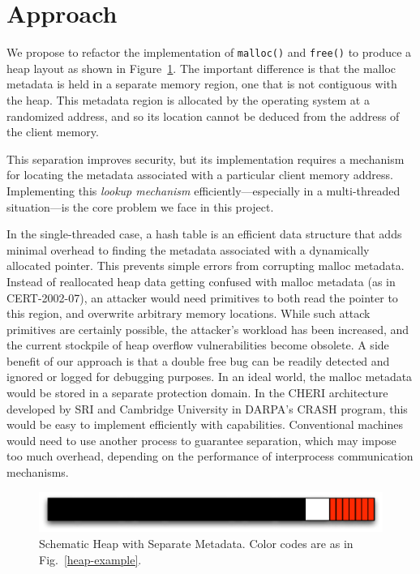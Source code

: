 \documentclass[twoside,12pt]{cslreport}
\begin{document}
\section{Approach}

We propose to refactor the implementation of \texttt{malloc()} and
\texttt{free()} to produce a heap layout as shown in
Figure~\ref{heap-split}.  The important difference is that the
malloc metadata is held in a separate memory region, one that is not
contiguous with the heap. This metadata region is allocated by the operating
system at a randomized address, and so its location cannot be deduced from the
address of the client memory.

This separation improves security, but its implementation requires a
mechanism for locating the metadata associated with a particular
client memory address.  Implementing this {\em lookup mechanism\/}
efficiently---especially in a multi-threaded situation---is the core
problem we face in this project.

In the single-threaded case, a hash table is an efficient data
structure that adds minimal overhead to finding the metadata
associated with a dynamically allocated pointer. This prevents
simple errors from corrupting malloc metadata.  Instead of reallocated
heap data getting confused with malloc metadata (as in CERT-2002-07),
an attacker would need primitives to both read the pointer to this
region, and overwrite arbitrary memory locations. While such attack
primitives are certainly possible, the attacker's workload has been
increased, and the current stockpile of heap overflow vulnerabilities
become obsolete.  A side benefit of our approach is that a double free
bug can be readily detected and ignored or logged for debugging
purposes.  In an ideal world, the malloc metadata would be stored in a
separate protection domain.  In the CHERI architecture developed by
SRI and Cambridge University in DARPA's CRASH program, this would be
easy to implement efficiently with capabilities. Conventional machines
would need to use another process to guarantee separation, which may
impose too much overhead, depending on the performance of interprocess
communication mechanisms.

\begin{figure}
\begin{center}
\includegraphics{heap-split}
\end{center}
\caption[Schematic Heap with Separate Metadata]{Schematic Heap with
  Separate Metadata. Color codes are as in Fig.~\ref{heap-example}.}
\label{heap-split}
\end{figure}
\end{document}
